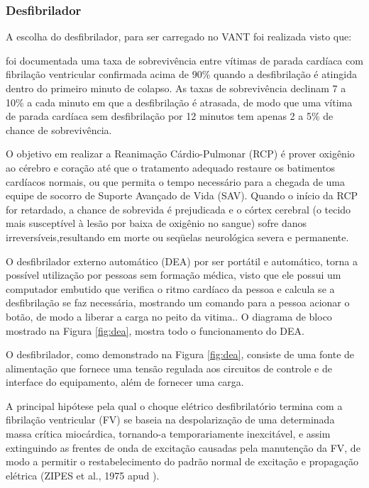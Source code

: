 \subsubsection{Desfibrilador}

A escolha do desfibrilador, para ser carregado no VANT foi realizada visto que:

\begin{citacao}
foi documentada uma taxa de 
sobrevivência entre vítimas de parada cardíaca com fibrilação ventricular confirmada acima de 90\% quando a desfibrilação é atingida
dentro do primeiro minuto de colapso. As taxas de sobrevivência declinam 7 a 10\% a cada minuto em que a desfibrilação
é atrasada, de modo que uma vítima de parada cardíaca sem desfibrilação por 12 minutos tem apenas 2 a 5\%
de chance de sobrevivência.\cite{1}
\end{citacao}

O objetivo em realizar a Reanimação Cárdio-Pulmonar (RCP) é prover oxigênio ao cérebro e coração até que
o tratamento adequado restaure os batimentos cardíacos normais, ou que permita o tempo necessário para a 
chegada de uma equipe de socorro de Suporte Avançado de Vida (SAV). Quando o início da RCP for retardado, 
a chance de sobrevida é prejudicada e o córtex cerebral (o tecido mais susceptível à lesão por baixa de 
oxigênio no sangue) sofre danos irreversíveis,resultando em morte ou seqüelas neurológica severa e permanente. \cite{2}

O desfibrilador externo automático (DEA) por ser portátil e automático, torna a possível utilização por 
pessoas sem formação médica, visto que ele possui um computador embutido que verifica o ritmo cardíaco da 
pessoa e calcula se a desfibrilação se faz necessária, mostrando um comando para a pessoa acionar o botão, de 
modo a liberar a carga no peito da vitima.\cite{3}. O diagrama de bloco mostrado na Figura \ref{fig:dea}, mostra todo o funcionamento do DEA.


O desfibrilador, como demonstrado na Figura \ref{fig:dea}, consiste de uma fonte  de alimentação que 
fornece uma tensão regulada aos circuitos de controle e de interface do equipamento, além de fornecer uma carga.

A principal hipótese pela qual o choque elétrico desfibrilatório termina com a fibrilação ventricular (FV) se
baseia na despolarização de uma determinada massa crítica miocárdica, tornando-a temporariamente inexcitável, e
assim extinguindo as frentes de onda de excitação causadas pela manutenção da FV, de modo a permitir o 
restabelecimento do padrão normal de excitação e propagação elétrica (ZIPES et al., 1975 apud ).

